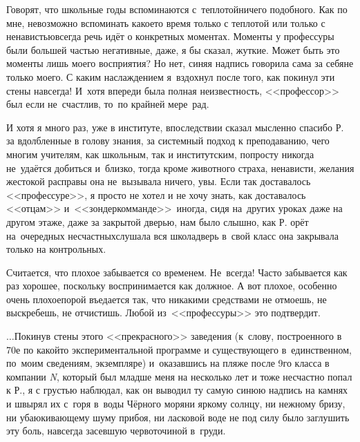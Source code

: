 Говорят, что школьные годы вспоминаются с~теплотой\mdash ничего подобного. Как по мне, невозможно вспоминать какое\sdash то время только с теплотой или только с ненавистью\mdash всегда речь идёт о конкретных моментах. Моменты у профессуры были большей частью негативные, даже, я бы сказал, жуткие. Может быть это моменты лишь моего восприятия? Но нет, синяя надпись говорила сама за себя\mdash не только моего. С каким наслаждением я~вздохнул после того, как покинул эти стены навсегда! И~хотя впереди была полная неизвестность, <<профессор>> был если не~счастлив, то~по крайней мере~рад. 

И хотя я много раз, уже в институте, впоследствии сказал мысленно спасибо Р. за вдолбленные в голову знания, за системный подход к преподаванию, чего многим учителям, как школьным, так и институтским, попросту никогда не~удаётся добиться и~близко, тогда кроме животного страха, ненависти, желания жестокой расправы она не~вызывала ни\sdash че\sdash го, увы. Если так доставалось <<профессуре>>, я просто не хотел и не хочу знать, как доставалось <<отцам>> и~<<зондеркомманде>>~\cite{ГеографГлобусПропил}\mdash иногда, сидя на~других уроках даже на другом этаже, даже за закрытой дверью, нам было слышно, как Р. орёт на~очередных несчастных\mdash слушала вся школа\mdash дверь в~свой класс она закрывала только на контрольных.

Считается, что плохое забывается со временем. Не~всегда! Часто забывается как раз хорошее, поскольку воспринимается как должное. А вот плохое, особенно очень плохое\mdash порой въедается так, что никакими средствами не отмоешь, не выскребешь, не отчистишь. Любой из~<<профессуры>> это подтвердит. %

$\ldots$Покинув стены этого <<прекрасного>> заведения (к~слову, построенного в 70\sdash е по какой\sdash то экспериментальной программе и существующего в~единственном, по~моим сведениям, экземпляре) и~оказавшись на пляже после 9\sdash го класса в компании \textit{N}, который был младше меня на несколько лет и тоже несчастно попал к Р., я с грустью наблюдал, как он выводил ту самую синюю надпись на камнях и швырял их с~горя в~воды Чёрного моря\mdash ни яркому солнцу, ни нежному бризу, ни убаюкивающему шуму прибоя, ни ласковой воде не под силу было заглушить эту боль, навсегда засевшую червоточиной в~груди.

\begin{center}
\end{center}